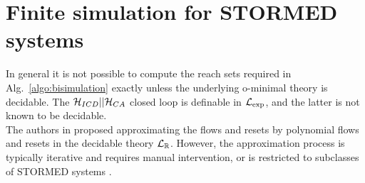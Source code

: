 \section{Finite simulation for STORMED systems}
\label{sec:simulationAprox}
In general it is not possible to compute the reach sets required in Alg.~\ref{algo:bisimulation} exactly unless the underlying o-minimal theory is decidable.
The $\mathcal{H}_{ICD}||\mathcal{H}_{CA}$ closed loop is definable in $\mathcal{L}_{\exp}$, and the latter is not known to be decidable.\\
The authors in \cite{PrabhakarVVD09_toklerant} proposed approximating the flows and resets by polynomial flows and resets in the decidable theory $\mathcal{L}_{\mathbb{R}}$.
However, the approximation process is typically iterative and requires manual intervention, or is restricted to subclasses of STORMED systems \cite{PrabhakarVVD09_toklerant}.

